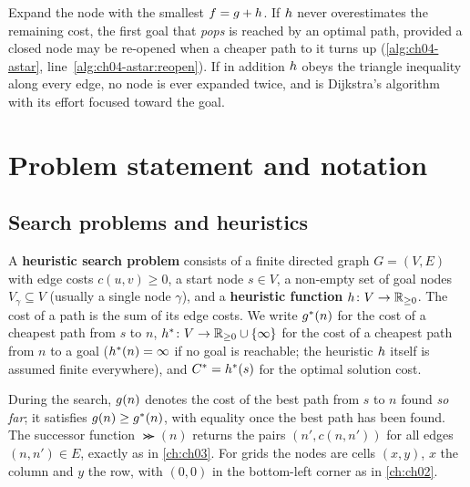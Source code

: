 \begin{keyidea}
Expand the node with the smallest $f = g + h$. If $h$ never
overestimates the remaining cost, the first goal that \astar \emph{pops} is
reached by an optimal path, provided a closed node may be re-opened when a
cheaper path to it turns up (\cref{alg:ch04-astar},
line~\ref{alg:ch04-astar:reopen}). If in addition $h$ obeys the triangle inequality along
every edge, no node is ever expanded twice, and \astar is Dijkstra's algorithm
with its effort focused toward the goal.
\end{keyidea}

\section{Problem statement and notation}
\label{sec:ch04-problem}

\subsection{Search problems and heuristics}

\begin{definition}
\label{def:ch04-problem}
A \textbf{heuristic search problem} consists of a
finite directed graph $G = (V, E)$ with edge costs $c(u, v) \ge 0$, a start node
$s \in V$, a non-empty set of goal nodes $V_\gamma \subseteq V$ (usually a single
node $\gamma$), and a \textbf{heuristic function} $h \colon V \to
\mathbb{R}_{\ge 0}$. The cost of a path is the sum of its edge costs. We write
$g^*(n)$ for the cost of a cheapest path from $s$ to $n$,
$h^* \colon V \to \mathbb{R}_{\ge 0} \cup \{\infty\}$ for the cost of a cheapest
path from $n$ to a goal ($h^*(n) = \infty$ if no goal is reachable; the
heuristic $h$ itself is assumed finite everywhere), and $C^* = h^*(s)$ for
the optimal solution cost.
\end{definition}

During the search, $g(n)$ denotes the cost of the best path from $s$ to
$n$ found \emph{so far}; it satisfies $g(n) \ge g^*(n)$, with equality
once the best path has been found. The successor function $\Succ(n)$ returns the
pairs $(n', c(n, n'))$ for all edges $(n, n') \in E$, exactly as in
\cref{ch:ch03}. For grids the nodes are cells $(x, y)$, $x$ the column and
$y$ the row, with $(0, 0)$ in the bottom-left corner as in \cref{ch:ch02}.

